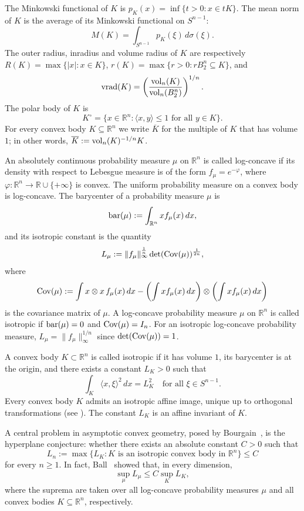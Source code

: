 \documentclass[11pt,leqno]{article}
\theoremstyle{definition}
\numberwithin{equation}{section}
\newcommand{\ls}{\leqslant}
\newcommand{\gr}{\geqslant}
\begin{document}
The Minkowski functional of $K$ is $p_K(x) = \inf\{ t > 0 : x \in tK \}$. The mean norm of $K$ is the average of its Minkowski functional on $S^{n-1}$:
\[M(K)=\int_{S^{n-1}}p_K(\xi)\,d\sigma(\xi).\]
The outer radius, inradius and volume radius of $K$ are respectively $R(K) = \max\{ |x| : x \in K \}$, $r(K)=\max\{r>0:rB_2^n\subseteq K\}$,
and
\[{\rm vrad}(K) = \left( \frac{{\rm vol}_n(K)}{{\rm vol}_n(B_2^n)} \right)^{1/n}.\]
The {polar body} of $K$ is
\[K^{\circ} = \{ x \in \mathbb{R}^n : \langle x, y \rangle \ls 1 \text{ for all } y \in K \}.\]
For every convex body $K\subseteq \mathbb{R}^n$ we write $\overline{K}$ for the multiple of $K$ that has
volume $1$; in other words, $\overline{K}:={\rm vol}_n(K)^{-1/n}K$.

\medskip
An absolutely continuous probability measure $\mu$ on $\mathbb{R}^n$ is called {log-concave} if its density with respect
to Lebesgue measure is of the form
$f_\mu = e^{-\varphi}$, where $\varphi : \mathbb{R}^n \to \mathbb{R} \cup \{+\infty\}$ is convex.  
The uniform probability measure on a convex body is log-concave. The barycenter of a probability measure $\mu$ is
\[{\rm bar}(\mu) := \int_{\mathbb{R}^n} x f_\mu(x) \, dx,\]
and its {isotropic constant} is the quantity
\begin{equation*}L_\mu := \|f_\mu\|_{\infty}^{\frac{1}{n}}\det({\rm Cov}(\mu))^{\frac{1}{2n}},\end{equation*}
where
\[{\rm Cov}(\mu) := \int x \otimes x \,f_{\mu}(x)\, dx- \left( \int xf_{\mu}(x) \, dx \right) \otimes \left( \int xf_{\mu}(x) \, dx \right)\]
is the covariance matrix of $\mu$.  
A log-concave probability measure $\mu$ on $\mathbb{R}^n$ is called {isotropic} if ${\rm bar}(\mu) = 0$ and ${\rm Cov}(\mu) = I_n$. For an isotropic
log-concave probability measure, $L_{\mu}=\|f_{\mu}\|_{\infty}^{1/n}$ since $\det({\rm Cov}(\mu))=1$. 
\medskip

A convex body $K \subset \mathbb{R}^n$ is called {isotropic} if it has volume $1$, its barycenter is at the origin, and there exists a constant $L_K > 0$ such that
\[\int_K \langle x, \xi \rangle^2 \, dx = L_K^2\quad\text{for all } \xi \in S^{n-1}.\]
Every convex body $K$ admits an isotropic affine image, unique up to orthogonal transformations (see \cite{BGVV-book}).
The constant $L_K$ is an affine invariant of $K$. 

A central problem in asymptotic convex geometry, posed by Bourgain~\cite{Bourgain-1986},
is the hyperplane conjecture: whether there exists an absolute constant $C>0$
such that
\[L_n:=\max\{L_K:K\text{ is an isotropic convex body in }\mathbb{R}^n\}\ls C\]
for every $n\gr 1$. In fact, Ball~\cite{Ball-1988} showed that, in every
dimension,
\[\sup_\mu L_\mu\ls C\sup_K L_K,\]
where the suprema are taken over all log-concave probability measures $\mu$ and
all convex bodies $K\subseteq\mathbb{R}^n$, respectively.
\end{document}
